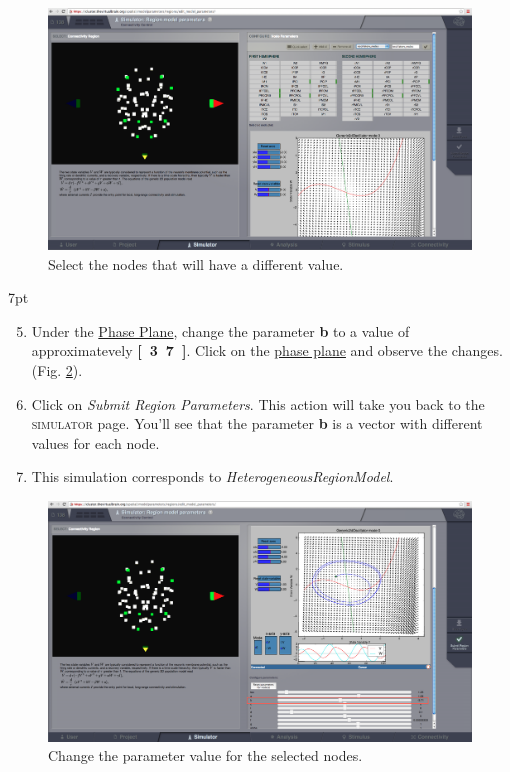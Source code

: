 \documentclass{tufte-handout}
\newenvironment{simulation}{%
  \def\FrameCommand{%
    \hspace{1pt}%
    {\color{ForestGreen}\vrule width 2pt}%
    {\color{simulationshade}\vrule width 4pt}%
    \colorbox{simulationshade}%
  }%
  \MakeFramed{\advance\hsize-\width\FrameRestore}%
  \noindent\hspace{-4.55pt}%
  \begin{adjustwidth}{}{7pt}%
  \vspace{2pt}\vspace{2pt}%
}
{%
  \vspace{2pt}\end{adjustwidth}\endMakeFramed%
}
\begin{document}
\begin{figure}[h]
  \includegraphics[width=\linewidth]{Handout_UI_HeterogenousModelAndStimulation_SpatializationSelectNodes.png}%
  \caption{Select the nodes that will have a different value.}%
  \label{fig:oscillatory_nodes}%
\end{figure}

\begin{simulation}
\begin{enumerate}
\setcounter{enumi}{4}
\item Under the \underline{Phase Plane}, change the parameter \textbf{b} to a value of approximatevely \textbf{\unit[3.7]}. Click on the \underline{phase plane} and observe the changes. (Fig. \ref{fig:oscillatory_nodes_trajectory}).
\item Click on \textit{Submit Region Parameters}. This action will take you back to the \textsc{simulator} page. You'll see that the parameter \textbf{b} is a vector with different values for each node. 
\item This simulation corresponds to  \textit{HeterogeneousRegionModel}.
\end{enumerate}
\end{simulation}

\begin{figure}[h]
  \includegraphics[width=\linewidth]{Handout_UI_HeterogenousModelAndStimulation_SpatializationChangeParameter.png}%
  \caption{Change the parameter value for the selected nodes.}%
  \label{fig:oscillatory_nodes_trajectory}%
\end{figure}
\end{document}

